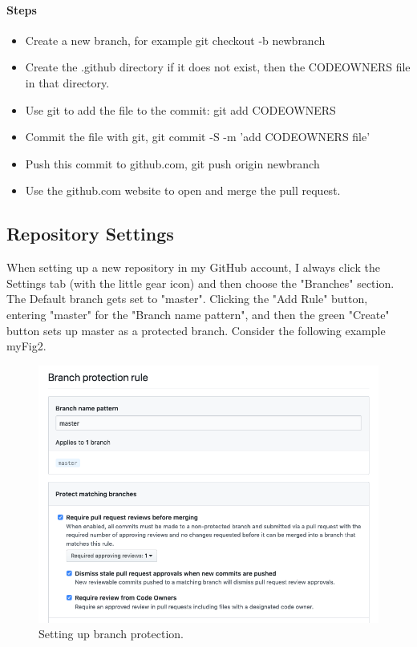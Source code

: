 \hypertarget{steps-4}{%
  \paragraph{Steps}\label{steps-4}}

\begin{itemize}

  \item
        Create a new branch, for example git checkout -b newbranch
  \item
        Create the .github directory if it does not exist, then the CODEOWNERS
        file in that directory.
  \item
        Use git to add the file to the commit: git add CODEOWNERS
  \item
        Commit the file with git, git commit -S -m 'add CODEOWNERS file'
  \item
        Push this commit to github.com, git push origin newbranch
  \item
        Use the github.com website to open and merge the pull request.
\end{itemize}


\subsection{Repository Settings}

\justify
When setting up a new repository in my GitHub account, I always click
the Settings tab (with the little gear icon) and then choose the
"Branches" section. The Default branch gets set to "master". Clicking
the "Add Rule" button, entering "master" for the "Branch name pattern",
and then the green "Create" button sets up master as a protected branch.
Consider the following example {myFig2}.

\begin{figure}
  \includegraphics[scale=0.50]{../images/github-branch-protection.png}
  \caption{Setting up branch protection.}
\end{figure}

